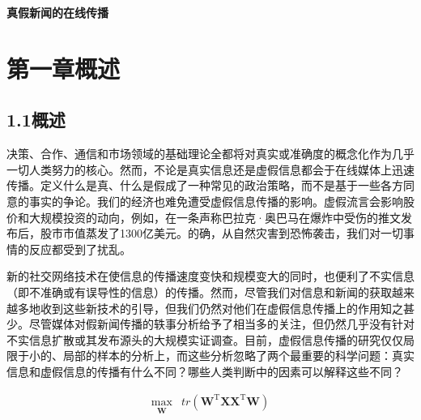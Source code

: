 \documentclass[a4paper,AutoFakeBold,oneside,12pt]{book}
\begin{document}
\begin{center}
\end{center}
\vspace{8mm}
\thispagestyle{empty}


\begin{center}
\sanhao\heiti\textbf{真假新闻的在线传播}

\xiaosihao{}

\xiaosihao{}
\end{center}

\songti{}
\begingroup %
\let\clearpage\relax
\let\cleardoublepage\relax


\chapter*{第一章\quad{}概述}
\newtranschapter

\section*{1.1\quad{}概述}
决策、合作、通信和市场领域的基础理论全都将对真实或准确度的概念化作为几乎一切人类努力的核心。然而，不论是真实信息还是虚假信息都会于在线媒体上迅速传播。定义什么是真、什么是假成了一种常见的政治策略，而不是基于一些各方同意的事实的争论。我们的经济也难免遭受虚假信息传播的影响。虚假流言会影响股价和大规模投资的动向，例如，在一条声称巴拉克·奥巴马在爆炸中受伤的推文发布后，股市市值蒸发了1300亿美元。的确，从自然灾害到恐怖袭击，我们对一切事情的反应都受到了扰乱。

新的社交网络技术在使信息的传播速度变快和规模变大的同时，也便利了不实信息（即不准确或有误导性的信息）的传播。然而，尽管我们对信息和新闻的获取越来越多地收到这些新技术的引导，但我们仍然对他们在虚假信息传播上的作用知之甚少。尽管媒体对假新闻传播的轶事分析给予了相当多的关注，但仍然几乎没有针对不实信息扩散或其发布源头的大规模实证调查。目前，虚假信息传播的研究仅仅局限于小的、局部的样本的分析上，而这些分析忽略了两个最重要的科学问题：真实信息和虚假信息的传播有什么不同？哪些人类判断中的因素可以解释这些不同？

\begin{equation}
\label{PCA_goal_appx1}
\begin{aligned}
\max_{\substack{\bm{W}}}  &  tr(\bm{W}^\mathrm{T}\bm{X}\bm{X}^ \mathrm{T}\bm{W})
\end{aligned}
\end{equation}
\end{document}
